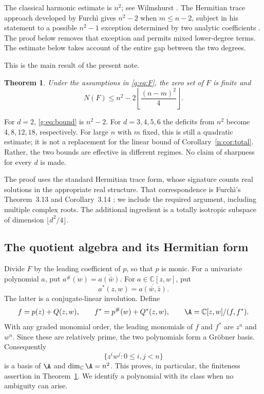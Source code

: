 \documentclass[UTF8,11pt]{ctexart}
\newtheorem{thm}{Theorem}[section]
\theoremstyle{definition}
\numberwithin{equation}{section}
\newcommand{\C}{\mathbb C}\newcommand{\R}{\mathbb R}
\begin{document}
The classical harmonic estimate is $n^2$; see Wilmshurst
\cite[pp.~2077--2079]{Wil98}. The Hermitian trace approach developed by
Furch\`i gives $n^2-2$ when $m\le n-2$, subject in his statement to a possible
$n^2-1$ exception determined by two analytic coefficients
\cite[Theorem~1.1, author version v2, p.~2]{Fur25}.
The proof below removes that exception and permits mixed lower-degree terms. The estimate below takes account of
the entire gap between the two degrees.

This is the main result of the present note.
\begin{thm}\label{g:thm:main}
Under the assumptions in \eqref{g:eq:F}, the zero set of $F$ is finite and
\begin{equation}\label{g:eq:bound}
 N(F)\le n^2-2\left\lfloor\frac{(n-m)^2}{4}\right\rfloor.
\end{equation}
\end{thm}

For $d=2$, \eqref{g:eq:bound} is $n^2-2$. For $d=3,4,5,6$ the deficits from
$n^2$ become $4,8,12,18$, respectively. For large $n$ with $m$ fixed, this is
still a quadratic estimate; it is not a replacement for the linear bound
of Corollary~\ref{n:cor:total}. Rather, the two bounds are effective in different regimes.
No claim of sharpness for every $d$ is made.

The proof uses the standard Hermitian trace form, whose signature counts
real solutions in the appropriate real structure. That correspondence is
Furch\`i's Theorem~3.13 and Corollary~3.14
\cite[author version v2, pp.~9--10]{Fur25}; we include the required argument,
including multiple complex roots. The additional ingredient is a totally
isotropic subspace of dimension $\lfloor d^2/4\rfloor$. 
\subsection{The quotient algebra and its Hermitian form}
Divide $F$ by the leading coefficient of $p$, so that $p$ is monic.
For a univariate polynomial $a$, put
$a^\#(w)=\overline{a(\bar w)}$. For $a\in\C[z,w]$, put
\[
 a^*(z,w)=\overline{a(\bar w,\bar z)}.
\]
The latter is a conjugate-linear involution. Define
\begin{equation}\label{g:eq:algebra}
 f=p(z)+Q(z,w),\qquad
 f^*=p^\#(w)+Q^*(z,w),\qquad
 \A=\C[z,w]/(f,f^*).
\end{equation}
With any graded monomial order, the leading monomials of $f$ and $f^*$ are
$z^n$ and $w^n$. Since these are relatively prime, the two polynomials form
a Gr\"obner basis. Consequently
\begin{equation}\label{g:eq:basis}
 \{z^i w^j:0\le i,j<n\}
\end{equation}
is a basis of $\A$ and $\dim_\C\A=n^2$. This proves, in particular, the
finiteness assertion in Theorem~\ref{g:thm:main}. We identify a polynomial
with its class when no ambiguity can arise.
\end{document}
